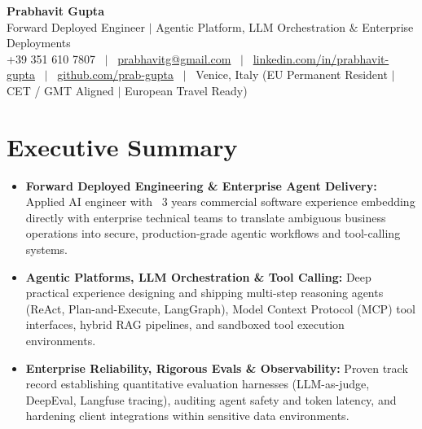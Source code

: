 \documentclass[a4paper,10pt]{article}
\begin{document}
\begin{minipage}[c]{0.80\textwidth}
  {\Huge\bfseries Prabhavit Gupta}\\[3pt]
  {\color{accent}\large Forward Deployed Engineer $\vert$ Agentic Platform, LLM Orchestration $\&$ Enterprise Deployments}\\[6pt]
  {\footnotesize +39 351 610 7807 ~$\vert$~
  \href{mailto:prabhavitg@gmail.com}{prabhavitg@gmail.com} ~$\vert$~
  \href{https://www.linkedin.com/in/prabhavit-gupta}{linkedin.com/in/prabhavit-gupta} ~$\vert$~
  \href{https://github.com/prab-gupta}{github.com/prab-gupta} ~$\vert$~
  Venice, Italy (EU Permanent Resident $\vert$ CET / GMT Aligned $\vert$ European Travel Ready)}
\end{minipage}\hfill

\vspace{6pt}

\section{Executive Summary}
\begin{itemize}
  \item \textbf{Forward Deployed Engineering \& Enterprise Agent Delivery:} Applied AI engineer with ~3 years commercial software experience embedding directly with enterprise technical teams to translate ambiguous business operations into secure, production-grade agentic workflows and tool-calling systems.
  \item \textbf{Agentic Platforms, LLM Orchestration \& Tool Calling:} Deep practical experience designing and shipping multi-step reasoning agents (ReAct, Plan-and-Execute, LangGraph), Model Context Protocol (MCP) tool interfaces, hybrid RAG pipelines, and sandboxed tool execution environments.
  \item \textbf{Enterprise Reliability, Rigorous Evals \& Observability:} Proven track record establishing quantitative evaluation harnesses (LLM-as-judge, DeepEval, Langfuse tracing), auditing agent safety and token latency, and hardening client integrations within sensitive data environments.
\end{itemize}

\end{document}
